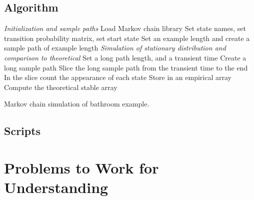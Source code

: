 \documentclass[12pt]{article}
\begin{document}
\subsection*{Algorithm}

\begin{algorithm}[H]
    \DontPrintSemicolon
    \BlankLine
    \emph{Initialization and sample paths}\;
    Load Markov chain library\;
    Set state names, set transition probability matrix, set start
    state\;
    Set an example length and create a sample path of example length\;
    \BlankLine
    \emph{Simulation of stationary distribution and comparison to theoretical}\;
    Set a long path length, and a transient time\;
    Create a long sample path\;
    Slice the long sample path from the transient time to the end\;
    In the slice count the appearance of each state\;
    Store in an empirical array\;
    Compute the theoretical stable array\;

    \caption{Markov chain simulation of bathroom example.}
\end{algorithm}

\subsection*{Scripts}



\hr

\section*{Problems to Work for Understanding}

\renewcommand{\theexerciseseries}{}
\renewcommand{\theexercise}{\arabic{exercise}}
\end{document}

